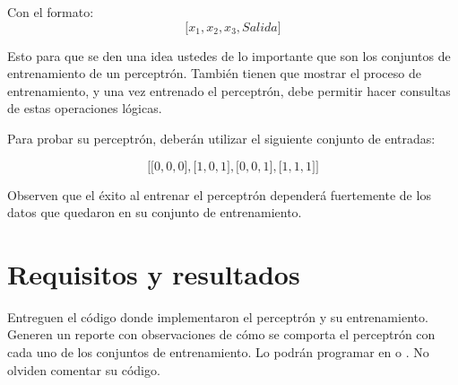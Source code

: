 Con el formato: \[\texttt{[}x_1, x_2, x_3, Salida\texttt{]} \]

\noindent Esto para que se den una idea ustedes de lo importante que son los conjuntos de entrenamiento de un perceptrón.
También tienen que mostrar el proceso de entrenamiento, y una vez entrenado el perceptrón, debe permitir hacer consultas de estas operaciones lógicas.\par
Para probar su perceptrón, deberán utilizar el siguiente conjunto de entradas:

\[\texttt{[}\texttt{[}0,0,0\texttt{]}, \texttt{[}1,0,1\texttt{]}, \texttt{[}0,0,1\texttt{]}, \texttt{[}1,1,1\texttt{]} \texttt{]}\]

Observen que el éxito al entrenar el perceptrón dependerá fuertemente de los datos que quedaron en su conjunto de entrenamiento.



\section{Requisitos y resultados}

Entreguen el código donde implementaron el perceptrón y su entrenamiento.  Generen un reporte con observaciones de cómo se comporta el perceptrón con cada uno de los conjuntos de entrenamiento. Lo podrán programar en  o . No olviden comentar su código.\medskip





